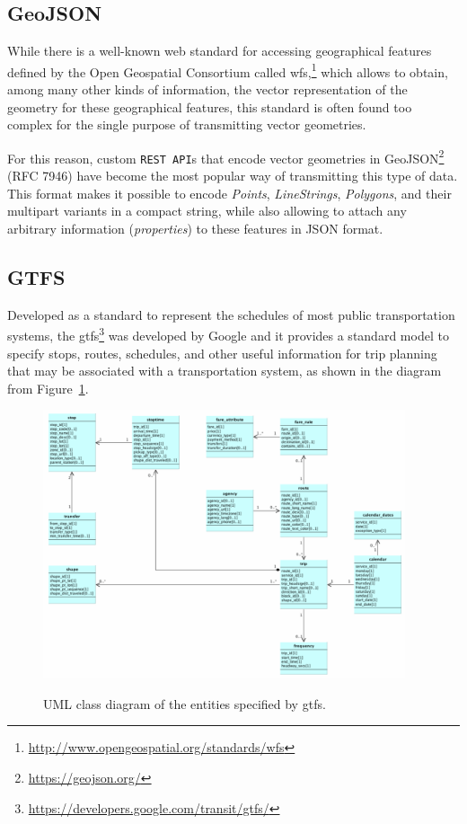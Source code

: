     \subsection{GeoJSON}
    While there is a \mbox{well-known} web standard for accessing geographical features defined by the Open Geospatial Consortium called \gls{wfs},\footnote{\url{http://www.opengeospatial.org/standards/wfs}} which allows to obtain, among many other kinds of information, the vector representation of the geometry for these geographical features, this standard is often found too complex for the single purpose of transmitting vector geometries.
    
    For this reason, custom \texttt{REST API}s that encode vector geometries in GeoJSON\footnote{\url{https://geojson.org/}} (RFC 7946) have become the most popular way of transmitting this type of data. This format makes it possible to encode \textit{Points},  \textit{LineStrings}, \textit{Polygons}, and their multipart variants in a compact string, while also allowing to attach any arbitrary information (\textit{properties}) to these features in JSON format.
    
    \subsection{GTFS}
    Developed as a standard to represent the schedules of most public transportation systems, the \acrfull{gtfs}\footnote{\url{https://developers.google.com/transit/gtfs/}} was developed by Google and it provides a standard model to specify stops, routes, schedules, and other useful information for trip planning that may be associated with a transportation system, as shown in the diagram from Figure~\ref{fig:gis:gtfs}.
    
    \begin{figure}[ht]
		\begin{center}
			{\includegraphics[width=0.95\textwidth]{figures/gtfs.png}}
		\end{center}
		\caption{UML class diagram of the entities specified by \acrshort{gtfs}.}
		\label{fig:gis:gtfs}
	\end{figure}
	
